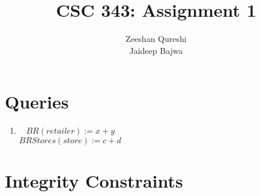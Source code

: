 \documentclass[12pt, a4paper, titlepage]{article}
\title{CSC 343: Assignment 1}
\author{Zeeshan Qureshi \\ Jaideep Bajwa}
\begin{document}
  \maketitle
  \section{Queries}
  \begin{enumerate}
    \item 
      \ \newline
       $ BR(retailer)  :=  x + y $ \\
       $ BRStores(store)  :=  c + d $ \\
  \end{enumerate}

  \section{Integrity Constraints}
\end{document}
